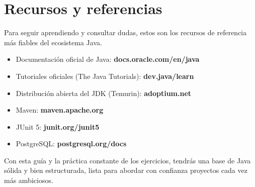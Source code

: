 \documentclass[11pt]{article}
\begin{document}
\section{Recursos y referencias}
Para seguir aprendiendo y consultar dudas, estos son los recursos de referencia más fiables del ecosistema Java.

\begin{itemize}[leftmargin=1.4em,itemsep=2pt,topsep=2pt]
\item Documentación oficial de Java: \textbf{docs.oracle.com/en/java}
\item Tutoriales oficiales (The Java Tutorials): \textbf{dev.java/learn}
\item Distribución abierta del JDK (Temurin): \textbf{adoptium.net}
\item Maven: \textbf{maven.apache.org}
\item JUnit 5: \textbf{junit.org/junit5}
\item PostgreSQL: \textbf{postgresql.org/docs}
\end{itemize}
Con esta guía y la práctica constante de los ejercicios, tendrás una base de Java sólida y bien estructurada, lista para abordar con confianza proyectos cada vez más ambiciosos.
\end{document}
